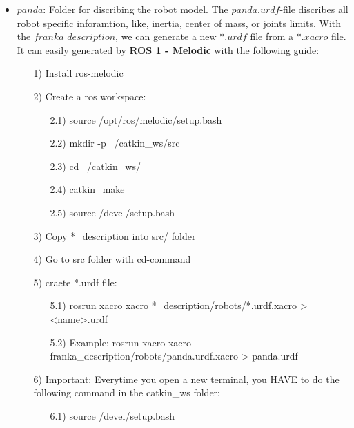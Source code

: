 \documentclass[
	ngerman,
	accentcolor=9c,%
	type=intern,
	marginpar=false
	]{tudapub}
\begin{document}
\begin{itemize}
\item $panda$: Folder for discribing the robot model. The $panda.urdf$-file discribes all robot specific inforamtion, like, inertia, center of mass, or joints limits. With the $franka\_description$, we can generate a new $*.urdf$ file from a $*.xacro$ file. It can easily generated by \textbf{ROS 1 - Melodic} with the following guide: 
\begin{itemize}
\item[1)] Install ros-melodic
\item[2)] Create a ros workspace:
\begin{itemize}
\item[2.1)] source /opt/ros/melodic/setup.bash
\item[2.2)] mkdir -p ~/catkin\_ws/src
\item[2.3)] cd ~/catkin\_ws/
\item[2.4)] catkin\_make
\item[2.5)] source /devel/setup.bash
\end{itemize}
\item[3)] Copy *\_description into src/ folder 
\item[4)] Go to src folder with cd-command
\item[5)] craete *.urdf file:
\begin{itemize}
\item[5.1)] rosrun xacro xacro *\_description/robots/*.urdf.xacro > <name>.urdf
\item[5.2)] Example: rosrun xacro xacro franka\_description/robots/panda.urdf.xacro > panda.urdf
\end{itemize}
\item[6)] Important: Everytime you open a new terminal, you HAVE to do the following command in the catkin\_ws folder:
\begin{itemize}
\item[6.1)] source /devel/setup.bash
\end{itemize}
\end{itemize}
\end{itemize}
\end{document}
